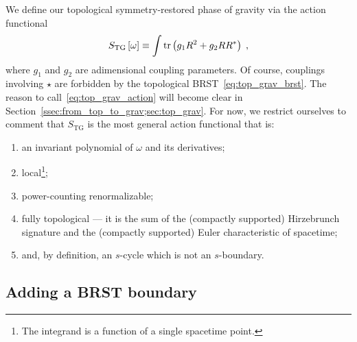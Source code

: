 \documentclass[../main.tex]{subfiles}
\begin{document}
We define our topological symmetry-restored phase of gravity via the action functional
\begin{equation}
  \label{eq:top_grav_action}
  S_{\text{TG}}\left[ \omega \right] \equiv \int \operatorname{tr} \left( g_1 R^2 + g_2 RR^* \right)\;,
\end{equation}
where $g_1$ and $g_2$ are adimensional coupling parameters. Of course, couplings involving $ \star $ are forbidden by the topological BRST~\eqref{eq:top_grav_brst}. The reason to call~\eqref{eq:top_grav_action}  will become clear in Section~\ref{ssec:from_top_to_grav;sec:top_grav}. For now, we restrict ourselves to comment that $S_{\text{TG}}$ is the most general action functional that is:
\begin{enumerate}[label=\roman*)] %
  \item an invariant polynomial of $\omega$ and its derivatives;
  \item local\footnote{The integrand is a function of a single spacetime point. };
  \item power-counting renormalizable;
  \item fully topological --- it is the sum of the (compactly supported) Hirzebrunch signature and the (compactly supported) Euler characteristic of spacetime;
  \item  and, by definition, an $s$-cycle which is not an $s$-boundary.
\end{enumerate}

\subsection{Adding a BRST boundary}%
\label{ssec:brst_boundary;sec:top_grav}
\end{document}
